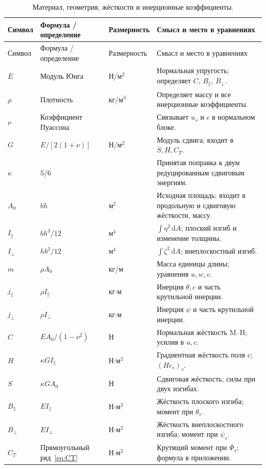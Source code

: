 \documentclass[11pt,a4paper]{article}
\newcommand{\dd}{\,\mathrm d}
\begin{document}
\begin{longtable}{>{\raggedright\arraybackslash}p{.09\linewidth}>{\raggedright\arraybackslash}p{.24\linewidth}>{\raggedright\arraybackslash}p{.13\linewidth}>{\raggedright\arraybackslash}p{.43\linewidth}}
\caption{Материал, геометрия, жёсткости и инерционные коэффициенты.}\label{tab:coeff}\\
\hline
Символ & Формула / определение & Размерность & Смысл и место в уравнениях\\\hline
\endfirsthead
\hline Символ & Формула / определение & Размерность & Смысл и место в уравнениях\\\hline
\endhead
$E$ & Модуль Юнга & Н/м$^2$ & Нормальная упругость; определяет $C$, $B_\parallel$, $B_\perp$.\\[5pt]
$\rho$ & Плотность & кг/м$^3$ & Определяет массу и все инерционные коэффициенты.\\[5pt]
$\nu$ & Коэффициент Пуассона & 1 & Связывает $u_s$ и $c$ в нормальном блоке.\\[5pt]
$G$ & $E/[2(1+\nu)]$ & Н/м$^2$ & Модуль сдвига; входит в $S,H,C_T$.\\[5pt]
$\kappa$ & $5/6$ & 1 & Принятая поправка к двум редуцированным сдвиговым энергиям.\\[5pt]
$A_0$ & $bh$ & м$^2$ & Исходная площадь; входит в продольную и сдвиговую жёсткости, массу.\\[5pt]
$I_\parallel$ & $bh^3/12$ & м$^4$ & $\int\eta^2\dd A$; плоский изгиб и изменение толщины.\\[5pt]
$I_\perp$ & $hb^3/12$ & м$^4$ & $\int\zeta^2\dd A$; внеплоскостный изгиб.\\[5pt]
$m$ & $\rho A_0$ & кг/м & Масса единицы длины; уравнения $u,w,v$.\\[5pt]
$j_\parallel$ & $\rho I_\parallel$ & кг$\cdot$м & Инерция $\theta,c$ и часть крутильной инерции.\\[5pt]
$j_\perp$ & $\rho I_\perp$ & кг$\cdot$м & Инерция $\psi$ и часть крутильной инерции.\\[5pt]
$C$ & $EA_0/(1-\nu^2)$ & Н & Нормальная жёсткость M--H; усилия в $u,c$.\\[5pt]
$H$ & $\kappa G I_\parallel$ & Н$\cdot$м$^2$ & Градиентная жёсткость поля $c$; $(Hc_s)_s$.\\[5pt]
$S$ & $\kappa GA_0$ & Н & Сдвиговая жёсткость; силы при двух изгибах.\\[5pt]
$B_\parallel$ & $EI_\parallel$ & Н$\cdot$м$^2$ & Жёсткость плоского изгиба; момент при $\theta_s$.\\[5pt]
$B_\perp$ & $EI_\perp$ & Н$\cdot$м$^2$ & Жёсткость внеплоскостного изгиба; момент при $\psi_s$.\\[5pt]
$C_T$ & Прямоугольный ряд~\eqref{eq:CT} & Н$\cdot$м$^2$ & Крутящий момент при $\Phi_s$; формула в приложении.\\\hline
\end{longtable}
\end{document}
